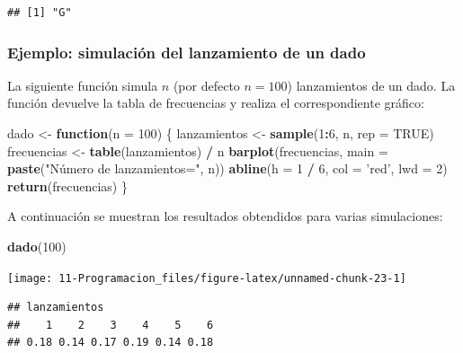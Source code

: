 \documentclass[]{book}
\newenvironment{Shaded}{\begin{snugshade}}{\end{snugshade}}
\newcommand{\ControlFlowTok}[1]{\textcolor[rgb]{0.13,0.29,0.53}{\textbf{#1}}}
\newcommand{\DataTypeTok}[1]{\textcolor[rgb]{0.13,0.29,0.53}{#1}}
\newcommand{\DecValTok}[1]{\textcolor[rgb]{0.00,0.00,0.81}{#1}}
\newcommand{\KeywordTok}[1]{\textcolor[rgb]{0.13,0.29,0.53}{\textbf{#1}}}
\newcommand{\NormalTok}[1]{#1}
\newcommand{\OperatorTok}[1]{\textcolor[rgb]{0.81,0.36,0.00}{\textbf{#1}}}
\newcommand{\OtherTok}[1]{\textcolor[rgb]{0.56,0.35,0.01}{#1}}
\newcommand{\StringTok}[1]{\textcolor[rgb]{0.31,0.60,0.02}{#1}}
\begin{document}
\begin{verbatim}
## [1] "G"
\end{verbatim}

\hypertarget{ejemplo-simulacion-del-lanzamiento-de-un-dado}{%
\subsubsection{Ejemplo: simulación del lanzamiento de un dado}\label{ejemplo-simulacion-del-lanzamiento-de-un-dado}}

La siguiente función simula \(n\) (por defecto \(n=100\)) lanzamientos de un
dado. La función devuelve la tabla de frecuencias y realiza el
correspondiente gráfico:

\begin{Shaded}
\begin{Highlighting}[]
\NormalTok{dado <-}\StringTok{ }\ControlFlowTok{function}\NormalTok{(}\DataTypeTok{n =} \DecValTok{100}\NormalTok{) \{}
\NormalTok{  lanzamientos <-}\StringTok{ }\KeywordTok{sample}\NormalTok{(}\DecValTok{1}\OperatorTok{:}\DecValTok{6}\NormalTok{, n, }\DataTypeTok{rep =} \OtherTok{TRUE}\NormalTok{)}
\NormalTok{  frecuencias <-}\StringTok{ }\KeywordTok{table}\NormalTok{(lanzamientos) }\OperatorTok{/}\StringTok{ }\NormalTok{n}
  \KeywordTok{barplot}\NormalTok{(frecuencias, }\DataTypeTok{main =} \KeywordTok{paste}\NormalTok{(}\StringTok{"Número de lanzamientos="}\NormalTok{, n))}
  \KeywordTok{abline}\NormalTok{(}\DataTypeTok{h =} \DecValTok{1} \OperatorTok{/}\StringTok{ }\DecValTok{6}\NormalTok{, }\DataTypeTok{col =} \StringTok{'red'}\NormalTok{, }\DataTypeTok{lwd =} \DecValTok{2}\NormalTok{)}
  \KeywordTok{return}\NormalTok{(frecuencias)}
\NormalTok{\}}
\end{Highlighting}
\end{Shaded}

A continuación se muestran los resultados obtendidos para
varias simulaciones:

\begin{Shaded}
\begin{Highlighting}[]
\KeywordTok{dado}\NormalTok{(}\DecValTok{100}\NormalTok{)}
\end{Highlighting}
\end{Shaded}

\begin{center}\texttt{[image: 11-Programacion\_files/figure-latex/unnamed-chunk-23-1]} \end{center}

\begin{verbatim}
## lanzamientos
##    1    2    3    4    5    6 
## 0.18 0.14 0.17 0.19 0.14 0.18
\end{verbatim}
\end{document}
